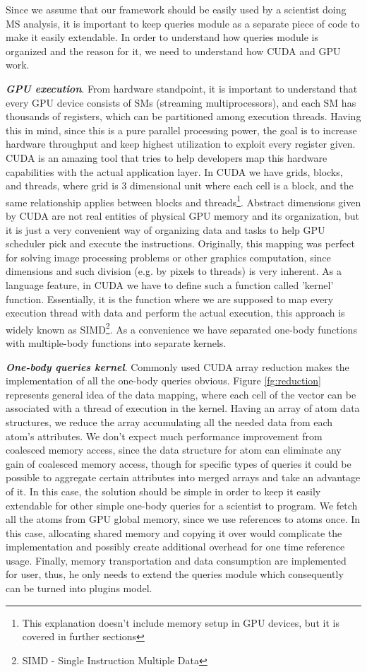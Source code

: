 \documentclass[12pt,letterpaper]{report}
\begin{document}
Since we assume that our framework should be easily used by a scientist doing MS analysis, it is important to keep queries module as a separate piece of code to make it easily extendable. In order to understand how queries module is organized and the reason for it, we need to understand how CUDA and GPU work.

\emph{\textbf{GPU execution}}. From hardware standpoint, it is important to understand that every GPU device consists of SMs (streaming multiprocessors), and each SM has thousands of registers, which can be partitioned among execution threads. Having this in mind, since this is a pure parallel processing power, the goal is to increase hardware throughput and keep highest utilization to exploit every register given. CUDA is an amazing tool that tries to help developers map this hardware capabilities with the actual application layer. In CUDA we have grids, blocks, and threads, where grid is 3 dimensional unit where each cell is a block, and the same relationship applies between blocks and threads\footnote{This explanation doesn't include memory setup in GPU devices, but it is covered in further sections}. Abstract dimensions given by CUDA are not real entities of physical GPU memory and its organization, but it is just a very convenient way of organizing data and tasks to help GPU scheduler pick and execute the instructions. Originally, this mapping was perfect for solving image processing problems or other graphics computation, since dimensions and such division (e.g. by pixels to threads) is very inherent. As a language feature, in CUDA we have to define such a function called 'kernel' function. Essentially, it is the function where we are supposed to map every execution thread with data and perform the actual execution, this approach is widely known as SIMD\footnote{SIMD - Single Instruction Multiple Data}. As a convenience we have separated one-body functions with multiple-body functions into separate kernels.

\emph{\textbf{One-body queries kernel}}.
Commonly used CUDA array reduction\cite{gpureduction} makes the implementation of all the one-body queries obvious. Figure \ref{fg:reduction} represents general idea of the data mapping, where each cell of the vector can be associated with a thread of execution in the kernel. Having an array of atom data structures, we reduce the array accumulating all the needed data from each atom's attributes. We don't expect much performance improvement from coalesced memory access, since the data structure for atom can eliminate any gain of coalesced memory access, though for specific types of queries it could be possible to aggregate certain attributes into merged arrays and take an advantage of it. In this case, the solution should be simple in order to keep it easily extendable for other simple one-body queries for a scientist to program. We fetch all the atoms from GPU global memory, since we use references to atoms once. In this case, allocating shared memory and copying it over would complicate the implementation and possibly create additional overhead for one time reference usage. Finally, memory transportation and data consumption are implemented for user, thus, he only needs to extend the queries module which consequently can be turned into plugins model.
\end{document}

